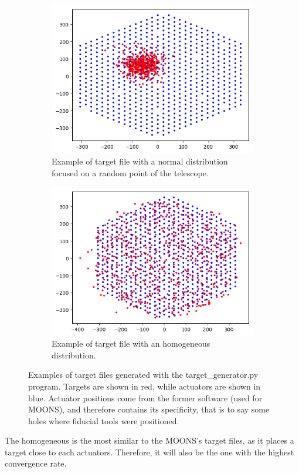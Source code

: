 \begin{figure}[h]
\begin{center}
		\begin{subfigure}{0.32\textwidth}
			\includegraphics[width=\textwidth]{target/focus_normal.png}
			\caption{Example of target file with a normal distribution focused on a random point of the telescope.}
		\end{subfigure}
		\begin{subfigure}{0.32\textwidth}
			\includegraphics[width=\textwidth]{target/homogeneous.png}
			\caption{Example of target file with an homogeneous distribution.}
		\end{subfigure}
		\caption{Examples of target files generated with the target_generator.py program. Targets are shown in red, while actuators are shown in blue. Actuator positions come from the former software (used for MOONS), and therefore contains its specificity, that is to say some holes where fiducial tools were positioned.}
		\label{fig:target_generator:examples}
	\end{center}
\end{figure}

The homogeneous is the most similar to the MOONS's target files, as it places a target close to each actuators. Therefore, it will also be the one with the highest convergence rate.